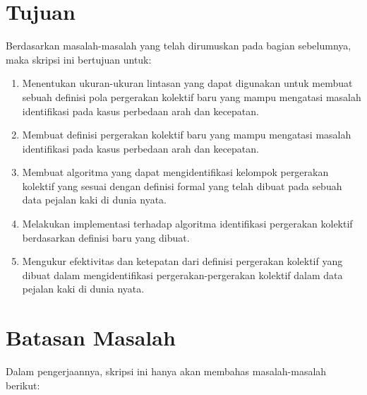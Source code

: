 \section{Tujuan}
\label{sec:tujuan}  

Berdasarkan masalah-masalah yang telah dirumuskan pada bagian sebelumnya, maka skripsi ini bertujuan untuk:

\iffalse

\lionov{``mengetahui'' jangan jadi tujuan, tapi jadi gini aja, pertama menentukan atau membuat ukuran yang baru yang akan digunakan, kedua membuat pemodelan yang baru, ketiga membuat algoritma}

\fi
\begin{enumerate}
    \item Menentukan ukuran-ukuran lintasan yang dapat digunakan untuk membuat sebuah definisi pola pergerakan kolektif baru yang mampu mengatasi masalah identifikasi pada kasus perbedaan arah dan kecepatan.
    \item Membuat definisi pergerakan kolektif baru yang mampu mengatasi masalah identifikasi pada kasus perbedaan arah dan kecepatan.
    \item Membuat algoritma yang dapat mengidentifikasi kelompok pergerakan kolektif yang sesuai dengan definisi formal yang telah dibuat pada sebuah data pejalan kaki di dunia nyata.
    \item Melakukan implementasi terhadap algoritma identifikasi pergerakan kolektif berdasarkan definisi baru yang dibuat.
    \item Mengukur efektivitas dan ketepatan dari definisi pergerakan kolektif yang dibuat dalam mengidentifikasi pergerakan-pergerakan kolektif dalam data pejalan kaki di dunia nyata.
\end{enumerate}

\section{Batasan Masalah}
\label{sec:batasan}

\iffalse

\lionov{ini bukan batasan, batasan itu misalnya: data cuma di R2, terus si kunci jawaban yang ada di data lintasan gak akan diubah-ubah, terus eksperimen hanya akan melihat hasil tapi tidak melihat penggunaan tempat dan waktu}

\fi
Dalam pengerjaannya, skripsi ini hanya akan membahas masalah-masalah berikut:

